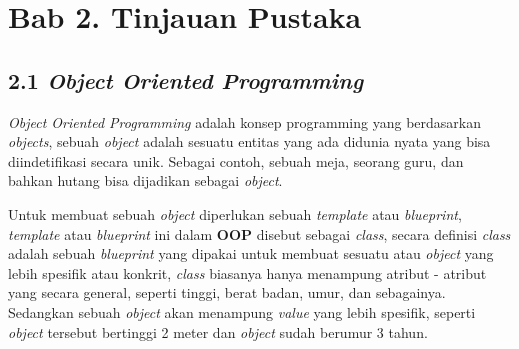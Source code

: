 \documentclass[a4paper]{article}
\begin{document}
\newpage
\section*{Bab 2. Tinjauan Pustaka}


\subsection*{2.1 \textit{Object Oriented Programming}}
\textit{Object Oriented Programming} adalah konsep programming yang berdasarkan \textit{objects}, sebuah \textit{object} adalah sesuatu entitas yang ada didunia nyata yang bisa diindetifikasi secara unik\autocite{liang_liang_2021}. Sebagai contoh, sebuah meja, seorang guru, dan bahkan hutang bisa dijadikan sebagai \textit{object}.

Untuk membuat sebuah \textit{object} diperlukan sebuah \textit{template} atau \textit{blueprint}, \textit{template} atau \textit{blueprint} ini dalam \textbf{OOP} disebut sebagai \textit{class}, secara definisi \textit{class} adalah sebuah \textit{blueprint} yang dipakai untuk membuat sesuatu atau \textit{object} yang lebih spesifik atau konkrit\autocite{education-erin-oop-2020}, \textit{class} biasanya hanya menampung atribut - atribut yang secara general, seperti tinggi, berat badan, umur, dan sebagainya. Sedangkan sebuah \textit{object} akan menampung \textit{value} yang lebih spesifik, seperti \textit{object} tersebut bertinggi 2 meter dan \textit{object} sudah berumur 3 tahun.
\end{document}

